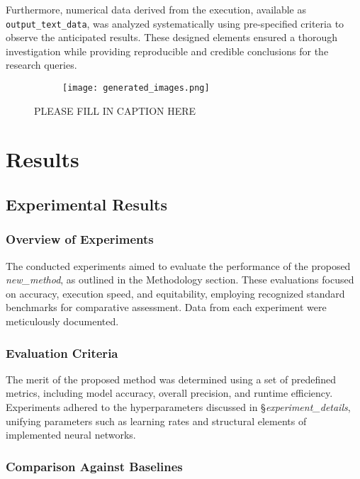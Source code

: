\documentclass{article} %
\begin{document}
Furthermore, numerical data derived from the execution, available as \texttt{output\_text\_data}, was analyzed systematically using pre-specified criteria to observe the anticipated results. These designed elements ensured a thorough investigation while providing reproducible and credible conclusions for the research queries.

\begin{figure}[t]
    \centering
    \begin{subfigure}{0.9\textwidth}
        \texttt{[image: generated\_images.png]}
        \label{fig:diffusion-samples}
    \end{subfigure}
    \caption{PLEASE FILL IN CAPTION HERE}
    \label{fig:first_figure}
\end{figure}

\section{Results}
\label{sec:results}
\subsection{Experimental Results}

\subsubsection{Overview of Experiments}

The conducted experiments aimed to evaluate the performance of the proposed \emph{new\_method}, as outlined in the Methodology section. These evaluations focused on accuracy, execution speed, and equitability, employing recognized standard benchmarks for comparative assessment. Data from each experiment were meticulously documented.

\subsubsection{Evaluation Criteria}

The merit of the proposed method was determined using a set of predefined metrics, including model accuracy, overall precision, and runtime efficiency. Experiments adhered to the hyperparameters discussed in \S\emph{experiment\_details}, unifying parameters such as learning rates and structural elements of implemented neural networks.

\subsubsection{Comparison Against Baselines}
\end{document}

